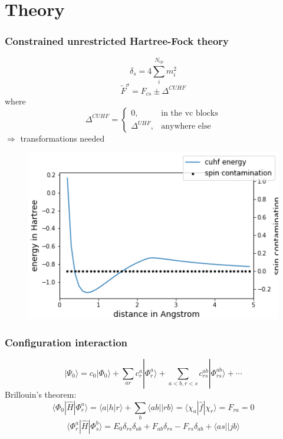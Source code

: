 \documentclass[aspectratio=169]{beamer}
\begin{document}
\section{Theory}

\begin{frame}
    \frametitle{Constrained unrestricted Hartree-Fock theory}
    \begin{equation}\label{eq:spincontfinal}
        \delta_s = 4\sum^{N_{cp}}_i m_i^2
      \end{equation}
    \begin{equation}
        \tilde{F}^{\sigma} = F_{cs} \pm \Delta^{CUHF}
    \end{equation}
    where
    \begin{equation}
        \Delta^{CUHF} = \begin{cases}
            0, & \mbox{in the vc blocks} \\
            \Delta^{UHF}, & \mbox{anywhere else}
        \end{cases}
    \end{equation}
    $\Longrightarrow$ transformations needed
\end{frame}

\begin{frame}
    \begin{figure}
        \includegraphics[width=0.6\linewidth]{./figures/cuhf_mix.png}
    \end{figure}
\end{frame}

\begin{frame}
    \frametitle{Configuration interaction} 
    \begin{equation}\label{eq:lincomb}
        |\Psi_0\rangle = c_0|\Phi_0\rangle + \sum_{ar}c_{r}^{a}|\Phi_r^a\rangle + \sum_{a<b,r<s}c_{rs}^{ab}|\Phi^{ab}_{rs} \rangle + \cdots
      \end{equation}
      Brillouin's theorem:
      \begin{equation}\label{eq:overlapsingle}
        \langle\Phi_0 |\hat{H}|\Phi_r^a\rangle = \langle a|h|r \rangle + \sum_b \langle ab||rb \rangle = \langle \chi_a |\hat{f}| \chi_r \rangle = F_{ra} = 0
      \end{equation}
      \begin{equation}\label{eq:matrixelement}
        \langle \Phi_r^a|\hat{H}|\Phi_s^b \rangle = E_0\delta_{rs}\delta_{ab} + F_{ab}\delta_{rs} - F_{rs}\delta_{ab} + \langle as || jb \rangle
      \end{equation}
\end{frame}
\end{document}
